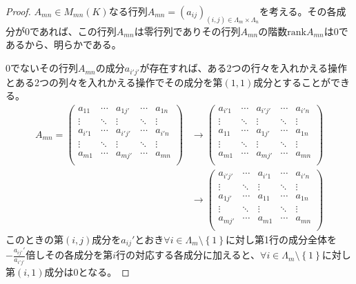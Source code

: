 \documentclass[dvipdfmx]{jsarticle}
\begin{document}
\begin{proof}
$A_{mn} \in M_{mn}(K)$なる行列$A_{mn} = \left( a_{ij} \right)_{(i,j) \in \varLambda_{m} \times \varLambda_{n}}$を考える。その各成分が0であれば、この行列$A_{mn}$は零行列でありその行列$A_{mn}$の階数${\mathrm{rank}}A_{mn}$は0であるから、明らかである。\par
0でないその行列$A_{mn}$の成分$a_{i'j'}$が存在すれば、ある2つの行々を入れかえる操作とある2つの列々を入れかえる操作でその成分を第$(1,1)$成分とすることができる。
\begin{align*}
A_{mn} = \begin{pmatrix}
a_{11} & \cdots & a_{1j'} & \cdots & a_{1n} \\
 \vdots & \ddots & \vdots & \ddots & \vdots \\
a_{i'1} & \cdots & a_{i'j'} & \cdots & a_{i'n} \\
 \vdots & \ddots & \vdots & \ddots & \vdots \\
a_{m1} & \cdots & a_{mj'} & \cdots & a_{mn} \\
\end{pmatrix} &\rightarrow \begin{pmatrix}
a_{i'1} & \cdots & a_{i'j'} & \cdots & a_{i'n} \\
 \vdots & \ddots & \vdots & \ddots & \vdots \\
a_{11} & \cdots & a_{1j'} & \cdots & a_{1n} \\
 \vdots & \ddots & \vdots & \ddots & \vdots \\
a_{m1} & \cdots & a_{mj'} & \cdots & a_{mn} \\
\end{pmatrix}\\
&\rightarrow \begin{pmatrix}
a_{i'j'} & \cdots & a_{i'1} & \cdots & a_{i'n} \\
 \vdots & \ddots & \vdots & \ddots & \vdots \\
a_{1j'} & \cdots & a_{11} & \cdots & a_{1n} \\
 \vdots & \ddots & \vdots & \ddots & \vdots \\
a_{mj'} & \cdots & a_{m1} & \cdots & a_{mn} \\
\end{pmatrix}
\end{align*}
このときの第$(i,j)$成分を$a_{ij}'$とおき$\forall i \in \varLambda_{m} \setminus \left\{ 1 \right\}$に対し第1行の成分全体を$- \frac{a_{ij'}'}{a_{i'j'}}$倍しその各成分を第$i$行の対応する各成分に加えると、$\forall i \in \varLambda_{m} \setminus \left\{ 1 \right\}$に対し第$(i,1)$成分は0となる。

\end{proof}
\end{document}
